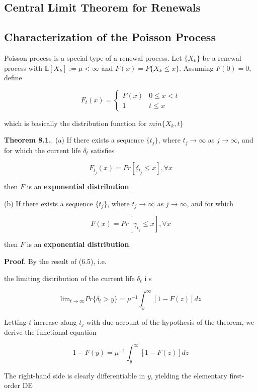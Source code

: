 \documentclass[12pt]{article}
\theoremstyle{nonumberbreak}
\begin{document}
\subsection{Central Limit Theorem for Renewals}




\subsection{Characterization of the Poisson Process}

Poisson process is a special type of a renewal process. Let $\{ X_k \}$ be a renewal process with $\mathbb{E} [X_k] := \mu < \infty$ and $F(x) = P \{ X_k \le x \}$. Assuming $F(0) = 0$, define

$$
F_t(x) = \begin{cases}
F(x) & 0 \le x < t \\[8pt]
1 & t \le x
\end{cases}
$$

which is basically the distribution function for $min \{ X_k, t \}$



\begin{theorem}
\textbf{Theorem 8.1.}.
(a) If there exists a sequence $\{ t_j \}$, where $t_j \to \infty$ as $j \to \infty$, and for which the current life $\delta_t$ satisfies 

$$
F_{t_j} (x) = Pr[ \delta_{t_j} \le x ], \forall x
$$

then $F$ is an \textbf{exponential distribution}.

(b) If there exists a sequence $\{ t_j \}$,  where $t_j \to \infty$ as $j \to \infty$, and for which

$$
F(x) = Pr [ \gamma_{t_j} \le x], \forall x
$$

then $F$ is an \textbf{exponential distribution}.
\end{theorem}


\textbf{Proof}. By the result of (6.5), i.e. 


the limiting distribution of the current life $\delta_t$ i s

$$
\mathrm{lim}_{t\to\infty} Pr\{ \delta_t > y \} = \mu^{-1} \int_y^\infty [1 - F(z)] dz
$$


Letting $t$ increase along $t_j$ with due account of the hypothesis of the theorem, we derive the functional equation

$$
1 - F(y) = \mu^{-1} \int_y^\infty [1- F(z)] dz
$$

The right-hand side is clearly differentiable in $y$, yielding the elementary first-order DE
\end{document}
